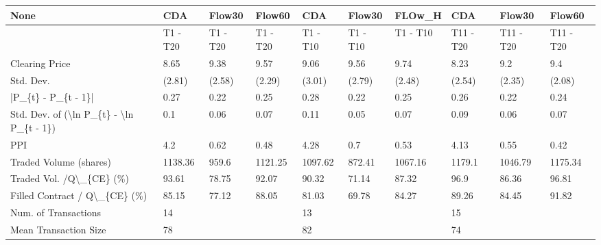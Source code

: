 \begin{tabular}{llllllllll}
\hline
 None                                                      & CDA      & Flow30   & Flow60   & CDA      & Flow30   & FLOw\_H   & CDA       & Flow30    & Flow60    \\
\hline
                                                           & T1 - T20 & T1 - T20 & T1 - T20 & T1 - T10 & T1 - T10 & T1 - T10 & T11 - T20 & T11 - T20 & T11 - T20 \\
 Clearing Price                                            & 8.65     & 9.38     & 9.57     & 9.06     & 9.56     & 9.74     & 8.23      & 9.2       & 9.4       \\
 Std. Dev.                                                 & (2.81)   & (2.58)   & (2.29)   & (3.01)   & (2.79)   & (2.48)   & (2.54)    & (2.35)    & (2.08)    \\
 |P\_\{t\} - P\_\{t - 1\}|                                       & 0.27     & 0.22     & 0.25     & 0.28     & 0.22     & 0.25     & 0.26      & 0.22      & 0.24      \\
 Std. Dev. of (\textbackslash{}ln P\_\{t\} - \textbackslash{}ln P\_\{t - 1\})                  & 0.1      & 0.06     & 0.07     & 0.11     & 0.05     & 0.07     & 0.09      & 0.06      & 0.07      \\
 PPI                                                       & 4.2      & 0.62     & 0.48     & 4.28     & 0.7      & 0.53     & 4.13      & 0.55      & 0.42      \\
 Traded Volume (shares)                                    & 1138.36  & 959.6    & 1121.25  & 1097.62  & 872.41   & 1067.16  & 1179.1    & 1046.79   & 1175.34   \\
 Traded Vol. /Q\textbackslash{}\_\{CE\} (\%)                                  & 93.61    & 78.75    & 92.07    & 90.32    & 71.14    & 87.32    & 96.9      & 86.36     & 96.81     \\
 Filled Contract / Q\textbackslash{}\_\{CE\} (\%)                             & 85.15    & 77.12    & 88.05    & 81.03    & 69.78    & 84.27    & 89.26     & 84.45     & 91.82     \\
 Num. of Transactions                                      & 14       &          &          & 13       &          &          & 15        &           &           \\
 Mean Transaction Size                                     & 78       &          &          & 82       &          &          & 74        &           &           \\

\end{tabular}
